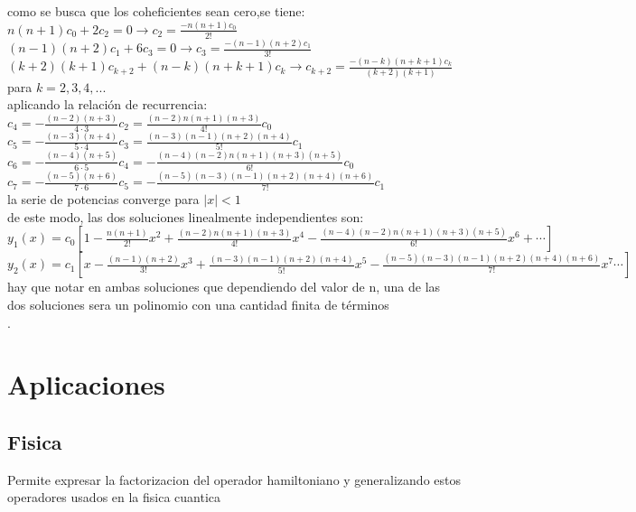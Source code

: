 \documentclass[12pt]{report}
\begin{document}
como se busca que los coheficientes sean cero,se tiene:\\
\vspace{0.3cm}
$n(n+1)c_{0}+2c_{2}=0\rightarrow c_{2}=\frac{-n(n+1)c_{0}}{2!}$\\
\vspace{0.3cm}
$(n-1)(n+2)c_{1}+6c_{3}=0\rightarrow c_{3}=\frac{-(n-1)(n+2)c_{1}}{3!}$\\
\vspace{0.3cm}
$(k+2)(k+1)c_{k+2}+(n-k)(n+k+1)c_{k}\rightarrow c_{k+2}=\frac{-(n-k)(n+k+1)c_{k}}{(k+2)(k+1)}$ para $k=2,3,4,...$\\
\vspace{0.3cm}
aplicando la relaci\'on de recurrencia:\\
\vspace{0.3cm}
$c_{4}=-\frac{(n-2)(n+3)}{4\cdot3}c_{2}=\frac{(n-2)n(n+1)(n+3)}{4!}c_{0}$\\
\vspace{0.3cm}
$c_{5}=-\frac{(n-3)(n+4)}{5\cdot4}c_{3}=\frac{(n-3)(n-1)(n+2)(n+4)}{5!}c_{1}$\\
\vspace{0.3cm}
$c_{6}=-\frac{(n-4)(n+5)}{6\cdot5}c_{4}=-\frac{(n-4)(n-2)n(n+1)(n+3)(n+5)}{6!}c_{0}$\\
\vspace{0.3cm}
$c_{7}=-\frac{(n-5)(n+6)}{7\cdot6}c_{5}=-\frac{(n-5)(n-3)(n-1)(n+2)(n+4)(n+6)}{7!}c_{1}$\\
la serie de potencias converge para $|x|<1$\\
\vspace{0.3cm}
de este modo, las dos soluciones linealmente independientes son:\\
\vspace{0.3cm}
$y_{1}(x)=c_{0}[1-\frac{n(n+1)}{2!}x^{2}+\frac{(n-2)n(n+1)(n+3)}{4!}x^{4}-\frac{(n-4)(n-2)n(n+1)(n+3)(n+5)}{6!}x^{6}+\cdots]$\\
\vspace{0.3cm}
$y_{2}(x)=c_{1}[x-\frac{(n-1)(n+2)}{3!}x^{3}+\frac{(n-3)(n-1)(n+2)(n+4)}{5!}x^{5}-\frac{(n-5)(n-3)(n-1)(n+2)(n+4)(n+6)}{7!}x^{7}\cdots]$\\
hay que notar en ambas soluciones que dependiendo del valor de n, una de las dos soluciones sera un polinomio con una cantidad finita de t\'erminos\\.
\section{Aplicaciones}
\subsection{Fisica}
Permite expresar la factorizacion del operador hamiltoniano y generalizando estos operadores usados en la fisica cuantica
\end{document}
